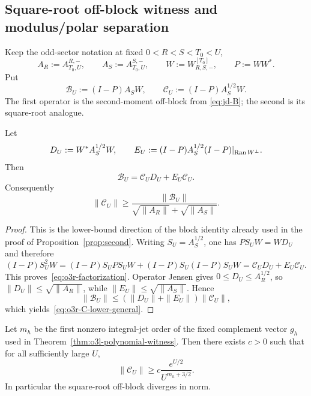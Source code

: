 
\subsection{Square-root off-block witness and modulus/polar separation}
\label{subsec:o3r-sqrt-offblock}

Keep the odd-sector notation at fixed $0<R<S<T_0<U$,
\[
 A_R:=A_{T_0,U}^{R,-},\qquad
 A_S:=A_{T_0,U}^{S,-},\qquad
 W:=W_{R,S,-}^{[T_0]},\qquad P:=WW^*.
\]
Put
\[
 \mathscr B_U:=(I-P)A_SW,
 \qquad
 \mathscr C_U:=(I-P)A_S^{1/2}W.
\tag{O3R.1}\label{eq:o3r-BC}
\]
The first operator is the second-moment off-block from
\eqref{eq:jd-B}; the second is its square-root analogue.

\begin{proposition}
\label{prop:o3r-block-factorization}
Let
\[
 D_U:=W^*A_S^{1/2}W,
 \qquad
 E_U:=(I-P)A_S^{1/2}(I-P)|_{\operatorname{Ran} W^\perp}.
\]
Then
\[
 \boxed{\mathscr B_U=\mathscr C_UD_U+E_U\mathscr C_U.}
\tag{O3R.2}\label{eq:o3r-factorization}
\]
Consequently
\[
 \boxed{
 \|\mathscr C_U\|
 \ge
 \frac{\|\mathscr B_U\|}
 {\sqrt{\|A_R\|}+\sqrt{\|A_S\|}}.
 }
\tag{O3R.3}\label{eq:o3r-C-lower-general}
\]
\end{proposition}

\begin{proof}
This is the lower-bound direction of the block identity already used in the proof of
Proposition~\ref{prop:second}.  Writing $S_U=A_S^{1/2}$, one has
$PS_UW=WD_U$ and therefore
\[
 (I-P)S_U^2W
 =(I-P)S_UPS_UW+(I-P)S_U(I-P)S_UW
 =\mathscr C_UD_U+E_U\mathscr C_U.
\]
This proves~\eqref{eq:o3r-factorization}.  Operator Jensen gives
$0\le D_U\le A_R^{1/2}$, so
$\|D_U\|\le\sqrt{\|A_R\|}$, while
$\|E_U\|\le\sqrt{\|A_S\|}$.  Hence
\[
 \|\mathscr B_U\|
 \le(\|D_U\|+\|E_U\|)\|\mathscr C_U\|,
\]
which yields~\eqref{eq:o3r-C-lower-general}.
\end{proof}

\begin{theorem}
\label{thm:o3r-sqrt-witness}
Let $m_h$ be the first nonzero integral-jet order of the fixed complement vector
$g_h$ used in Theorem~\ref{thm:o3l-polynomial-witness}.  Then there exists $c>0$ such
that for all sufficiently large $U$,
\[
 \boxed{
 \|\mathscr C_U\|
 \ge c\frac{e^{U/2}}{U^{m_h+3/2}}.
 }
\tag{O3R.4}\label{eq:o3r-C-lower}
\]
In particular the square-root off-block diverges in norm.
\end{theorem}

